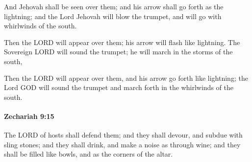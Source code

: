 			\begin{versebox}
					\item[BHS] 
					\item[LXX] 
					\item[ASV] And Jehovah shall be seen over them; and his arrow shall go forth as the lightning; and the Lord Jehovah will blow the trumpet, and will go with whirlwinds of the south.
					\item[NIV] Then the LORD will appear over them; his arrow will flash like lightning. The Sovereign LORD will sound the trumpet; he will march in the storms of the south,
					\item[NRSV] Then the LORD will appear over them, and his arrow go forth like lightning; the Lord GOD will sound the trumpet and march forth in the whirlwinds of the south.
			\end{versebox}

		\paragraph{Zechariah 9:15} %
			\label{ZECHARIAH-9-15}

			The LORD of hosts shall defend them; and they shall devour, and subdue with sling stones; and they shall drink, and make a noise as through wine; and they shall be filled like bowls, and as the corners of the altar.

